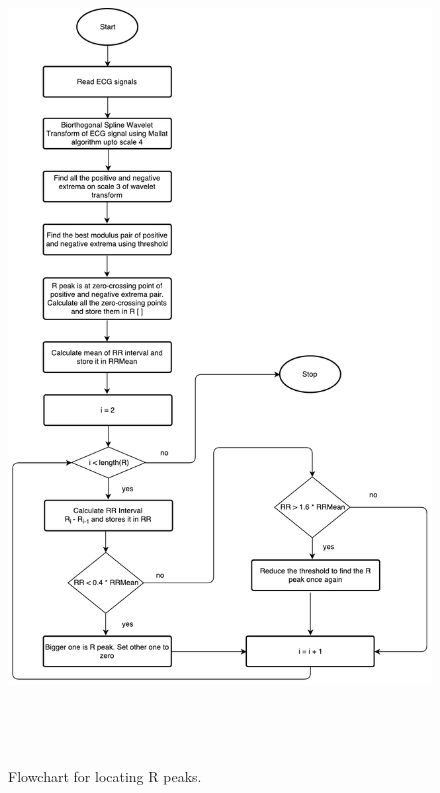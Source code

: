 \begin{figure}[htpb]
	\centering
	\includegraphics[width=25cm,height=22cm,keepaspectratio=true]{images/qrs.pdf}
	\caption{
		Flowchart for locating R peaks.
	}
	\label{fig:r_peaks_flow_chart}
\end{figure}


